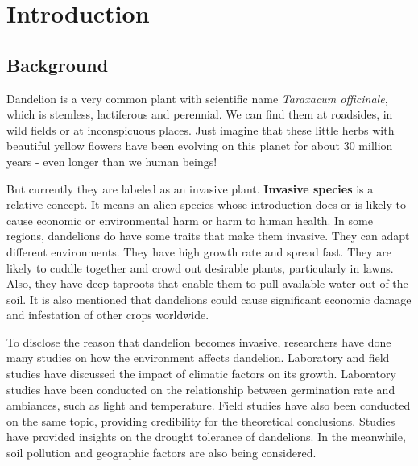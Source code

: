 \documentclass[12pt]{article}
\begin{document}
\maketitle
\tableofcontents

\section{Introduction}

	\subsection{Background}
	
	Dandelion is a very common plant with scientific name \textit{Taraxacum officinale}, which is stemless, lactiferous and perennial\autocite{stewart2002biology}.  We can find them at roadsides, in wild fields or at inconspicuous places.  Just imagine that these little herbs with beautiful yellow flowers have been evolving on this planet for about 30 million years\autocite{dandelionhistory} - even longer than we human beings!
	
	But currently they are labeled as an invasive plant.  \textbf{Invasive species} is a relative concept.  It means an alien species whose introduction does or is likely to cause economic or environmental harm or harm to human health\autocite{defInvasive}.  In some regions, dandelions do have some traits that make them invasive.  They can adapt different environments.  They have high growth rate and spread fast. They are likely to cuddle together and crowd out desirable plants, particularly in lawns.  Also, they have deep taproots that enable them to pull available water out of the soil.  It is also mentioned that dandelions could cause significant economic damage and infestation of other crops worldwide\autocite{stewart2002biology}.
	
	To disclose the reason that dandelion becomes invasive, researchers have done many studies on how the environment affects dandelion.  Laboratory and field studies have discussed the impact of climatic factors on its growth. Laboratory studies have been conducted on the relationship between germination rate and ambiances, such as light and temperature\autocite{letchamo1996light}.  Field studies have also been conducted on the same topic, providing credibility for the theoretical conclusions\autocite{yoneda1991effects}.  Studies have provided insights on the drought tolerance of dandelions\autocite{brock2005drought}. In the meanwhile, soil pollution and geographic factors are also being considered\autocite{verhoeven2013geographic}.
	
\end{document}
